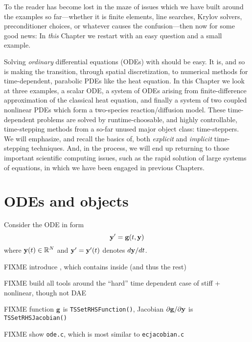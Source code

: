 
To the reader has become lost in the maze of issues which we have built around the examples so far---whether it is finite elements, line searches, Krylov solvers, preconditioner choices, or whatever causes the confusion---then now for some good news:  In \emph{this} Chapter we restart with an easy question and a small example.

Solving \emph{ordinary} differential equations (ODEs) with \PETSc should be easy.  It is, and so is making the transition, through spatial discretization, to numerical methods for time-dependent, parabolic PDEs like the heat equation.  In this Chapter we look at three examples, a scalar ODE, a system of ODEs arising from finite-difference approximation of the classical heat equation, and finally a system of two coupled nonlinear PDEs which form a two-species reaction/diffusion model.  These time-dependent problems are solved by runtime-choosable, and highly controllable, time-stepping methods from a so-far unused major \PETSc object class: \pTS time-steppers.  We will emphasize, and recall the basics of, both \emph{explicit} and \emph{implicit} time-stepping techniques.  And, in the process, we will end up returning to those important scientific computing issues, such as the rapid solution of large systems of equations, in which we have been engaged in previous Chapters.


\section{ODEs and \PETSc \pTS objects}

Consider the ODE in form
\begin{equation}
\mathbf{y}' = \mathbf{g}(t,\mathbf{y}) \label{eq:ts:ode}
\end{equation}
where $\mathbf{y}(t) \in \mathbb{R}^N$ and $\mathbf{y}'=\mathbf{y}'(t)$ denotes $d\mathbf{y}/dt$.

FIXME introduce \pTS, which contains \pSNES inside (and thus the rest)

FIXME build all tools around the ``hard'' time dependent case of stiff + nonlinear, though not DAE

FIXME function $\mathbf{g}$ is \texttt{TSSetRHSFunction()}, Jacobian $\partial \mathbf{g}/\partial \mathbf{y}$ is \texttt{TSSetRHSJacobian()}

FIXME show \texttt{ode.c}, which is most similar to \texttt{ecjacobian.c}



